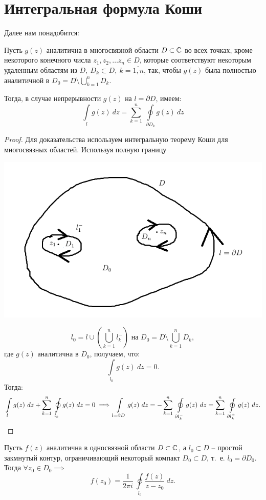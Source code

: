 \documentclass[../../main.tex]{subfiles}
\begin{document}
	\section{Интегральная формула Коши}
	Далее нам понадобится:
	\begin{lemma}
		Пусть $g(z)$ аналитична в многосвязной области $D \subset \mathbb{C}$ во всех 
		точках, кроме некоторого конечного числа $z_1, z_2, \dots z_n \in D$, 
		которые соответствуют некоторым удаленным областям из 
		$D,\ D_k \subset D,\ k = 
		\overline{1,n}$, так, чтобы $g(z)$ была полностью аналитичной в $D_0 = D 
		\setminus \bigcup \limits_{k=1}^{n} D_k$.
		
		Тогда, в случае непрерывности $g(z)$ на $l = \partial D$, имеем:
		\[\int \limits_{l} g(z) \ dz = \sum_{k=1}^{n} \ \oint \limits_{\partial D_k} 
		g(z) \ dz  \]
	\end{lemma}	
	\begin{proof}
	Для доказательства используем интегральную теорему Коши для многосвязных 
	областей. Используя полную границу
	\begin{center}
		\includegraphics[width=0.7\linewidth]{lec32_1}
	\end{center}
	\[ l_0 = l \cup \left(\bigcup \limits_{k=1}^{n} l^{-}_{k}\right) \text{ на } D_0 = D \setminus \bigcup 
	\limits_{k=1}^{n} D_k, \]
	где $g(z)$ аналитична в $D_0$, получаем, что:
	\[ \int \limits_{l_0} g(z) \ dz = 0. \]
	Тогда:
	\[ \int \limits_{l} g(z) \ dz + \sum^{n}_{k=1} \ \oint \limits_{ l_k} g(z) \ 
	dz = 0 \implies \int \limits_{l = \partial D} g(z) \ dz = - \sum_{k=1}^{n} \ 
	\oint \limits_{\partial l_k^{-} } g(z) \ dz = \sum_{k=1}^{n} \ \oint 
	\limits_{\partial l_k^{+} } g(z) \ dz. \qedhere \]
	\end{proof}	
\begin{theorem}
	Пусть $f(z)$ аналитична в односвязной области $D \subset \mathbb{C}$, а $l_0 \subset 
	D$ \--- простой закмнутый контур, ограничивающий некоторый компакт $D_0 
	\subset D$, т.~е. $l_0 = \partial D_0$. Тогда $\forall z_0\in D_0 \implies$
	\begin{equation}
	\label{32:3}
	f(z_0) = \frac{1}{2\pi i} \ \oint \limits_{l_0} \frac{f(z)}{z-z_0} \ dz.
	\end{equation}
\end{theorem}
\end{document}
